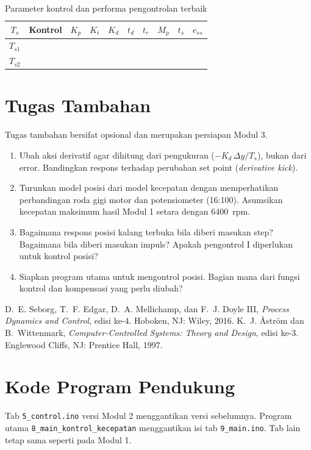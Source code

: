 \documentclass[11pt,a4paper]{article}
\newcommand{\prog}[1]{\texttt{#1}}
\begin{document}
\begin{table}[H]
\centering
\caption{Parameter kontrol dan performa pengontrolan terbaik}
\label{tab:terbaik}
\small
\begin{tabularx}{\textwidth}{|c|c|C|C|C|C|C|C|C|C|}
\hline
\textbf{$T_s$} & \textbf{Kontrol} & \textbf{$K_p$} & \textbf{$K_i$} & \textbf{$K_d$} & \textbf{$t_d$} & \textbf{$t_r$} & \textbf{$M_p$} & \textbf{$t_s$} & \textbf{$e_{ss}$} \\
\hline
$T_{s1}$ & & & & & & & & & \\
$T_{s2}$ & & & & & & & & & \\
\hline
\end{tabularx}
\end{table}

\section{Tugas Tambahan}
Tugas tambahan bersifat opsional dan merupakan persiapan Modul 3.
\begin{enumerate}
\item Ubah aksi derivatif agar dihitung dari pengukuran ($-K_d\,\Delta y/T_s$), bukan dari error. Bandingkan respons terhadap perubahan set point (\textit{derivative kick}).
\item Turunkan model posisi dari model kecepatan dengan memperhatikan perbandingan roda gigi motor dan potensiometer (16:100). Asumsikan kecepatan maksimum hasil Modul 1 setara dengan 6400~rpm.
\item Bagaimana respons posisi kalang terbuka bila diberi masukan step? Bagaimana bila diberi masukan impuls? Apakah pengontrol I diperlukan untuk kontrol posisi?
\item Siapkan program utama untuk mengontrol posisi. Bagian mana dari fungsi kontrol dan kompensasi yang perlu diubah?
\end{enumerate}

\begin{thebibliography}{9}
 D.~E. Seborg, T.~F. Edgar, D.~A. Mellichamp, dan F.~J. Doyle III, \textit{Process Dynamics and Control}, edisi ke-4. Hoboken, NJ: Wiley, 2016.
 K.~J. Åström dan B.~Wittenmark, \textit{Computer-Controlled Systems: Theory and Design}, edisi ke-3. Englewood Cliffs, NJ: Prentice Hall, 1997.
\end{thebibliography}

\clearpage
\appendix
\section{Kode Program Pendukung}
\label{lamp:kode}
Tab \prog{5\_control.ino} versi Modul 2 menggantikan versi sebelumnya. Program utama \prog{8\_main\_kontrol\_kecepatan} menggantikan isi tab \prog{9\_main.ino}. Tab lain tetap sama seperti pada Modul 1.
\end{document}
